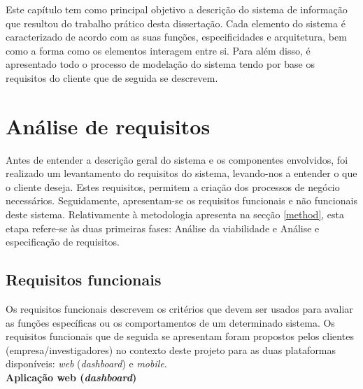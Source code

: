 Este capítulo tem como principal objetivo a descrição do sistema de informação que resultou do trabalho prático desta dissertação. Cada elemento do sistema é caracterizado de acordo com as suas funções, especificidades e arquitetura, bem como a forma como os elementos interagem entre si. Para além disso, é apresentado todo o processo de modelação do sistema tendo por base os requisitos do cliente que de seguida se descrevem.


\section{Análise de requisitos}
\label{sect:analise}



Antes de entender a descrição geral do sistema e os componentes envolvidos, foi realizado um levantamento do requisitos do sistema, levando-nos a entender o que o cliente deseja. Estes requisitos, permitem a criação dos processos de negócio necessários. Seguidamente, apresentam-se os requisitos funcionais e não funcionais deste sistema. Relativamente à metodologia apresenta na secção \ref{method}, esta etapa refere-se às duas primeiras fases: Análise da viabilidade e Análise e especificação de requisitos. 


\subsection{Requisitos funcionais}


Os requisitos funcionais descrevem os critérios que devem ser usados para avaliar as funções específicas ou os comportamentos de um determinado sistema. Os requisitos funcionais que de seguida se apresentam foram propostos pelos clientes (empresa/investigadores) no contexto deste projeto para as duas plataformas disponíveis: \textit{web} (\textit{dashboard}) e \textit{mobile}. \\


\textbf{Aplicação web (\textit{dashboard})}


